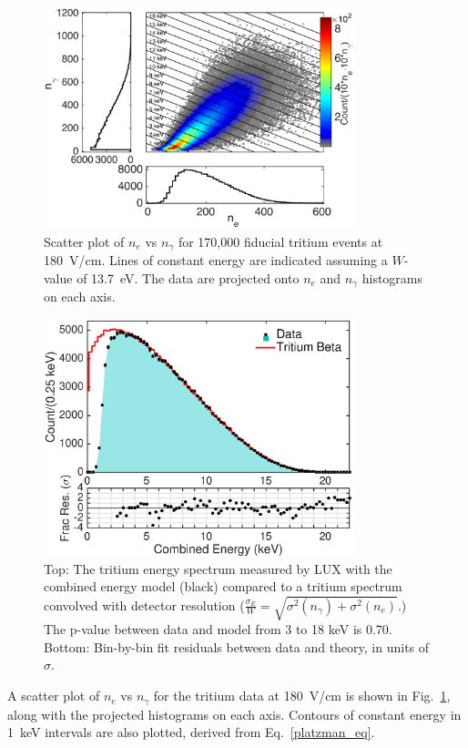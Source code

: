 \begin{figure}[h!]
\includegraphics[width=90mm]{fig/tritium-scatter.eps}
\caption{Scatter plot of $n_e$ vs $n_{\gamma}$ for 170,000 fiducial tritium events at 180~V/cm. Lines of constant energy are indicated assuming a $W$-value of 13.7~eV. The data are projected onto $n_e$ and $n_{\gamma}$ histograms on each axis.}
\label{fig:tritium-scatter}
\end{figure}


\begin{figure}[h!]
\begin{center}
\includegraphics[width=90mm]{fig/tritium-spectrum-linear.eps}
\caption{Top: The tritium energy spectrum measured by LUX with the combined energy model (black) compared to  a tritium spectrum convolved with detector resolution  ($\frac{\sigma_E}{W} = \sqrt{\sigma^2(n_{\gamma})+ \sigma^2(n_e)}$.) The p-value between data and model from 3 to 18 keV is 0.70. Bottom: Bin-by-bin fit residuals between data and theory, in units of $\sigma$. }
\label{fig:tritium-spectrum}
\end{center}
\end{figure}


A scatter plot of $n_e$ vs $n_{\gamma}$ for the tritium data at 180~V/cm is shown in Fig.~\ref{fig:tritium-scatter}, along with the projected histograms on each axis. Contours of constant energy in 1~keV intervals are also plotted, derived from Eq.~\ref{platzman_eq}. 

